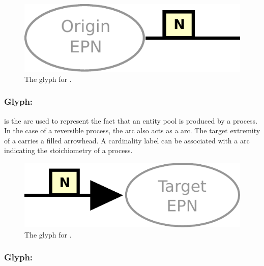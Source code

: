 \begin{figure}[H]
  \centering
  \includegraphics[scale = 0.4]{le_images/consumption}
  \caption{The \PD glyph for .}
  \label{fig:consumption}
\end{figure}



\subsubsection{Glyph: }\label{sec:production}

 is the arc used to represent the fact that an entity pool is produced by a process. In the case of a reversible process, the 
 arc also acts as a  arc. The target extremity of a  carries a filled arrowhead. A cardinality label can be associated with a  arc indicating the stoichiometry of a process.

\begin{figure}[H]
  \centering
  \includegraphics[scale = 0.4]{le_images/production}
  \caption{The \PD glyph for .}
  \label{fig:production}
\end{figure}

\subsubsection{Glyph: }\label{sec:modulation}

